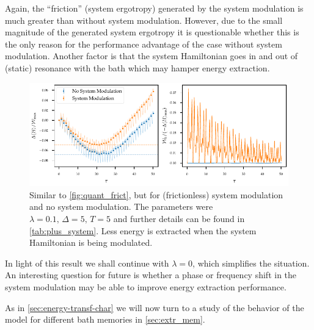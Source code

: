 Again, the ``friction'' (system ergotropy) generated by the system
modulation is much greater than without system modulation. However,
due to the small magnitude of the generated system ergotropy it is
questionable whether this is the only reason for the performance
advantage of the case without system modulation. Another factor is
that the system Hamiltonian goes in and out of (static) resonance with
the bath which may hamper energy extraction.
\begin{figure}[htp]
  \centering
  \includegraphics{figs/one_bath_mod/system_vs_no_system}
  \caption{\label{fig:quant_frict_sys_no_sys} Similar to
    \cref{fig:quant_frict}, but for (frictionless) system modulation
    and no system modulation. The parameters were
    \(λ=0.1,\, Δ=5,\, T=5\) and further details can be found in
    \cref{tab:plus_system}. Less energy is extracted when the system
    Hamiltonian is being modulated.}
\end{figure}

In light of this result we shall continue with \(λ=0\), which
simplifies the situation. An interesting question for future is
whether a phase or frequency shift in the system modulation may be
able to improve energy extraction performance.

As in \cref{sec:energy-transf-char} we will now turn to a study of the
behavior of the model for different bath memories in
\cref{sec:extr_mem}.


